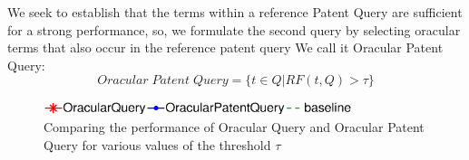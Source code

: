 We seek to establish that the terms within a reference Patent Query are sufficient for a strong performance, so, we formulate the second query by selecting oracular terms that also occur in the reference patent query We call it Oracular Patent Query:
\begin{equation}
 Oracular \; Patent \; Query = \{t\in Q|RF(t, Q)>\tau\}   
 \label{eq:score}
\end{equation}
\begin{figure}[t!]
\begin{centering}
\includegraphics[width=9cm]{figs/l1}
\par\end{centering}

\begin{centering}
\hspace*{1.5cm}  
\par\end{centering} 

\protect\caption{Comparing the performance of Oracular Query and Oracular Patent Query for various values of the threshold $\tau$}
\label{fig:oracularpq}
\end{figure}

